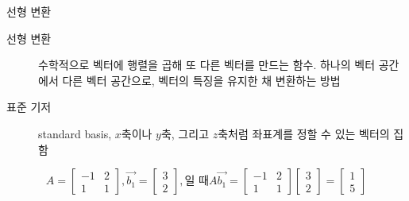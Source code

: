 \documentclass[10pt,t]{beamer}
\begin{document}
\begin{frame}{선형 변환}
    \begin{description}
        \item[선형 변환] 수학적으로 벡터에 행렬을 곱해 또 다른 벡터를 만드는 함수. 하나의 벡터 공간에서 다른 벡터 공간으로, 벡터의 특징을 유지한 채 변환하는 방법
        \item[표준 기저] standard basis, $x$축이나 $y$축, 그리고 $z$축처럼 좌표계를 정할 수 있는 벡터의 집함
    \end{description}
    \[A = \begin{bmatrix}
        -1 & 2 \\
        1 & 1 
    \end{bmatrix}, \vec{b_1} = \begin{bmatrix}
        3\\
        2
    \end{bmatrix}, \text{일 때} A\vec{b_1}= \begin{bmatrix}
        -1 & 2 \\
        1 & 1 
    \end{bmatrix}\begin{bmatrix}
        3\\
        2
    \end{bmatrix} = \begin{bmatrix}
        1\\
        5
    \end{bmatrix}\]
    

\end{frame}
\end{document}
